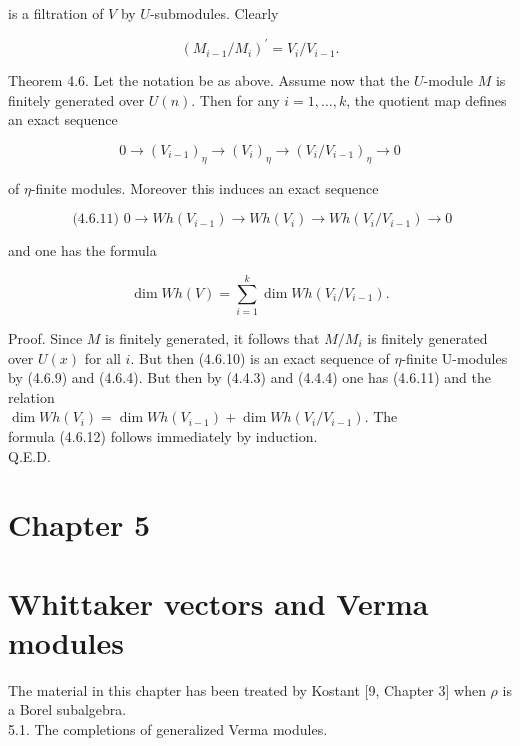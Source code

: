 \documentclass[10pt]{article}
\begin{document}
is a filtration of $V$ by $U$-submodules. Clearly


\begin{equation*}
\left(M_{i-1} / M_{i}\right)^{\prime}=V_{i} / V_{i-1} . \tag{4.6.9}
\end{equation*}


Theorem 4.6. Let the notation be as above. Assume now that the $U$-module $M$ is finitely generated over $U(n)$. Then for any $i=1, \ldots, k$, the quotient map defines an exact sequence


\begin{equation*}
0 \rightarrow\left(V_{i-1}\right)_{\eta} \rightarrow\left(V_{i}\right)_{\eta} \rightarrow\left(V_{i} / V_{i-1}\right)_{\eta} \rightarrow 0 \tag{4.6.10}
\end{equation*}


of $\eta$-finite modules. Moreover this induces an exact sequence

$$
\text { (4.6.11) } 0 \rightarrow W h\left(V_{i-1}\right) \rightarrow W h\left(V_{i}\right) \rightarrow W h\left(V_{i} / V_{i-1}\right) \rightarrow 0
$$

and one has the formula


\begin{equation*}
\operatorname{dim} W h(V)=\sum_{i=1}^{k} \operatorname{dim} W h\left(V_{i} / V_{i-1}\right) . \tag{4.6.12}
\end{equation*}


Proof. Since $M$ is finitely generated, it follows that $M / M_{i}$ is finitely generated over $U(x)$ for all $i$. But then (4.6.10) is an exact sequence of $\eta$-finite U-modules by (4.6.9) and (4.6.4). But then by (4.4.3) and (4.4.4) one has (4.6.11) and the relation\\
$\operatorname{dim} W h\left(V_{i}\right)=\operatorname{dim} W h\left(V_{i-1}\right)+\operatorname{dim} W h\left(V_{i} / V_{i-1}\right)$. The\\
formula (4.6.12) follows immediately by induction.\\
Q.E.D.

\section{Chapter 5}
\section{Whittaker vectors and Verma modules}
The material in this chapter has been treated by Kostant [9, Chapter 3] when $\rho$ is a Borel subalgebra.\\
5.1. The completions of generalized Verma modules.
\end{document}
